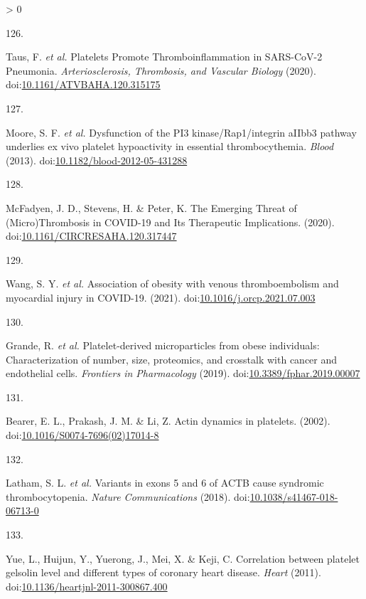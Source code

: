 \documentclass[11pt,twoside]{bristolthesis}
\newlength{\cslhangindent}
\newlength{\csllabelwidth}
\newenvironment{CSLReferences}[2] %
 {%
  \setlength{\parindent}{0pt}
  \ifodd #1 \everypar{\setlength{\hangindent}{\cslhangindent}}\ignorespaces\fi
  \ifnum #2 > 0
  \setlength{\parskip}{#2\baselineskip}
  \fi
 }%
 {}
\newcommand{\CSLLeftMargin}[1]{\parbox[t]{\csllabelwidth}{#1}}
\newcommand{\CSLRightInline}[1]{\parbox[t]{\linewidth - \csllabelwidth}{#1}\break}
\begin{document}
\begin{CSLReferences}{0}{0}
\leavevmode\hypertarget{ref-Taus2020}{}%
\CSLLeftMargin{126. }
\CSLRightInline{Taus, F. \emph{et al.} {Platelets Promote Thromboinflammation in SARS-CoV-2 Pneumonia}. \emph{Arteriosclerosis, Thrombosis, and Vascular Biology} (2020). doi:\href{https://doi.org/10.1161/ATVBAHA.120.315175}{10.1161/ATVBAHA.120.315175}}

\leavevmode\hypertarget{ref-Moore2013}{}%
\CSLLeftMargin{127. }
\CSLRightInline{Moore, S. F. \emph{et al.} {Dysfunction of the PI3 kinase/Rap1/integrin aIIbb3 pathway underlies ex vivo platelet hypoactivity in essential thrombocythemia}. \emph{Blood} (2013). doi:\href{https://doi.org/10.1182/blood-2012-05-431288}{10.1182/blood-2012-05-431288}}

\leavevmode\hypertarget{ref-McFadyen2020}{}%
\CSLLeftMargin{128. }
\CSLRightInline{McFadyen, J. D., Stevens, H. \& Peter, K. {The Emerging Threat of (Micro)Thrombosis in COVID-19 and Its Therapeutic Implications}. (2020). doi:\href{https://doi.org/10.1161/CIRCRESAHA.120.317447}{10.1161/CIRCRESAHA.120.317447}}

\leavevmode\hypertarget{ref-Wang2021}{}%
\CSLLeftMargin{129. }
\CSLRightInline{Wang, S. Y. \emph{et al.} {Association of obesity with venous thromboembolism and myocardial injury in COVID-19}. (2021). doi:\href{https://doi.org/10.1016/j.orcp.2021.07.003}{10.1016/j.orcp.2021.07.003}}

\leavevmode\hypertarget{ref-Grande2019}{}%
\CSLLeftMargin{130. }
\CSLRightInline{Grande, R. \emph{et al.} {Platelet-derived microparticles from obese individuals: Characterization of number, size, proteomics, and crosstalk with cancer and endothelial cells}. \emph{Frontiers in Pharmacology} (2019). doi:\href{https://doi.org/10.3389/fphar.2019.00007}{10.3389/fphar.2019.00007}}

\leavevmode\hypertarget{ref-Bearer2002}{}%
\CSLLeftMargin{131. }
\CSLRightInline{Bearer, E. L., Prakash, J. M. \& Li, Z. {Actin dynamics in platelets}. (2002). doi:\href{https://doi.org/10.1016/S0074-7696(02)17014-8}{10.1016/S0074-7696(02)17014-8}}

\leavevmode\hypertarget{ref-Latham2018}{}%
\CSLLeftMargin{132. }
\CSLRightInline{Latham, S. L. \emph{et al.} {Variants in exons 5 and 6 of ACTB cause syndromic thrombocytopenia}. \emph{Nature Communications} (2018). doi:\href{https://doi.org/10.1038/s41467-018-06713-0}{10.1038/s41467-018-06713-0}}

\leavevmode\hypertarget{ref-Yue2011}{}%
\CSLLeftMargin{133. }
\CSLRightInline{Yue, L., Huijun, Y., Yuerong, J., Mei, X. \& Keji, C. {Correlation between platelet gelsolin level and different types of coronary heart disease}. \emph{Heart} (2011). doi:\href{https://doi.org/10.1136/heartjnl-2011-300867.400}{10.1136/heartjnl-2011-300867.400}}


\end{CSLReferences}
\end{document}
